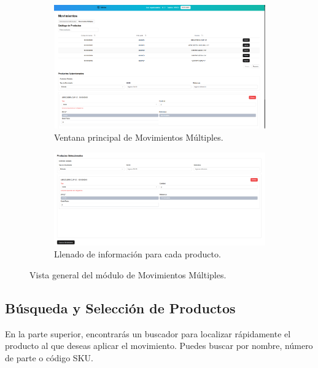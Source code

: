 \begin{figure}[ht!]
\centering
\begin{subfigure}{0.45\textwidth}
    \includegraphics[width=\textwidth]{imgs/Almacen_General/movimientos/movimientos_multiples/movimientos_multiples.png}
    \caption{Ventana principal de Movimientos Múltiples.}
    \label{fig:mov_mult_principal}
\end{subfigure}
\hfill
\begin{subfigure}{0.45\textwidth}
    \includegraphics[width=\textwidth]{imgs/Almacen_General/movimientos/movimientos_multiples/movimientos_multiples_productos_seleccionados.png}
    \caption{Llenado de información para cada producto.}
    \label{fig:mov_mult_form}
\end{subfigure}        
\caption{Vista general del módulo de Movimientos Múltiples.}
\label{fig:movimientos_multiples}
\end{figure}

\subsection*{Búsqueda y Selección de Productos}
En la parte superior, encontrarás un buscador para localizar rápidamente el producto al que deseas aplicar el movimiento. Puedes buscar por nombre, número de parte o código SKU.

